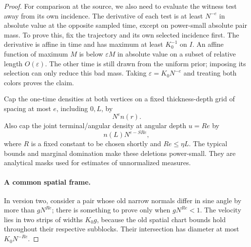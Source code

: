 \begin{proof}
For comparison at the source, we also need to evaluate the witness
test away from its own incidence.  The derivative of each test is
at least \(N^{-e}\) in absolute value at the opposite sampled time,
except on power-small absolute pair mass.  To prove this, fix the
trajectory and its
own selected incidence first.  The derivative is affine in time
and has maximum at least \(K_0^{-1}\) on \(I\).  An affine
function of maximum \(M\) is below \(\varepsilon M\) in absolute
value on a subset of relative length \(O(\varepsilon)\).
The other time is still drawn from the uniform prior; imposing
its selection can only reduce this bad mass.  Taking
\(\varepsilon=K_0N^{-e}\) and treating both colors proves the claim.

Cap the one-time densities at both vertices on a fixed
thickness-depth grid of spacing at most \(e\), including \(0,L\),
by
\[
 N^e n(r).
\]
Also cap the joint terminal/angular density at angular depth
\(u=Re\) by
\[
 n(L)N^{e-SRe},
\]
where \(R\) is a fixed constant to be chosen shortly and
\(Re\le\eta L\).  The typical bounds and marginal domination
make these deletions power-small.  They are analytical masks
used for estimates of unnormalized measures.

\paragraph{A common spatial frame.}
In version two, consider a pair whose old narrow normals differ
in sine angle by more than \(gN^{Re}\); there is something to
prove only when \(gN^{Re}<1\).
The velocity lies in two strips of widths \(K_0g\), because the
old spatial chart bounds hold throughout their respective
subblocks.  Their intersection has diameter at most
\(K_0N^{-Re}\).


\end{proof}
